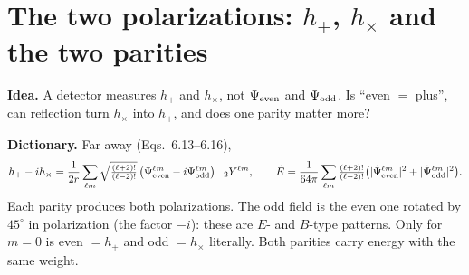 \documentclass[10pt,a4paper]{article}
\newcommand{\idea}[1]{\par\smallskip\noindent\colorbox{idea!8}{\parbox{\dimexpr\linewidth-2\fboxsep}{\small\textbf{\color{idea}Idea.} #1}}\par\smallskip}
\begin{document}
\section{The two polarizations: $h_+$, $h_\times$ and the two parities}
\idea{A detector measures $h_+$ and $h_\times$, not $\Psi_{\rm even}$ and $\Psi_{\rm odd}$. Is ``even $=$ plus'', can reflection
turn $h_\times$ into $h_+$, and does one parity matter more?}

\textbf{Dictionary.} Far away \cite{MP05} (Eqs.~6.13--6.16),
\begin{equation}
h_+-ih_\times=\frac1{2r}\sum_{\ell m}\sqrt{\tfrac{(\ell+2)!}{(\ell-2)!}}\,\big(\Psi^{\ell m}_{\rm even}-i\Psi^{\ell m}_{\rm odd}\big)\,{}_{-2}Y^{\ell m},\qquad
\dot E=\frac1{64\pi}\sum_{\ell m}\tfrac{(\ell+2)!}{(\ell-2)!}\big(|\dot\Psi^{\ell m}_{\rm even}|^2+|\dot\Psi^{\ell m}_{\rm odd}|^2\big).
\end{equation}
Each parity produces both polarizations. The odd field is the even one rotated by $45^\circ$ in polarization (the factor
$-i$): these are $E$- and $B$-type patterns. Only for $m=0$ is even $=h_+$ and odd $=h_\times$ literally. Both parities
carry energy with the same weight.
\end{document}
